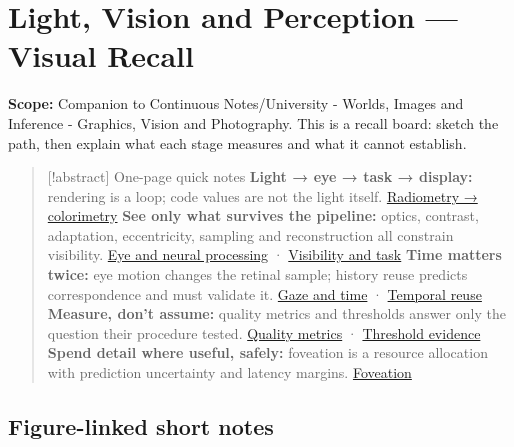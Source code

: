 \hypertarget{appendix-73c6b8ed5a87}{}\label{referencestart:appendix-73c6b8ed5a87}
\section{Light, Vision and Perception --- Visual Recall}\label{appendix-73c6b8ed5a87-light-vision-and-perception-visual-recall}

\textbf{Scope:} Companion to {Continuous Notes/University - Worlds, Images and Inference - Graphics, Vision and Photography}. This is a recall board: sketch the path, then explain what each stage measures and what it cannot establish.

\begin{quote}
{[}!abstract{]} One-page quick notes \textbf{Light → eye → task → display:} rendering is a loop; code values are not the light itself. \hyperref[04-visual-computing-ii-ch042-light-must-become-a-quantity-before-it-becomes-a-color]{Radiometry → colorimetry} \textbf{See only what survives the pipeline:} optics, contrast, adaptation, eccentricity, sampling and reconstruction all constrain visibility. \hyperref[04-visual-computing-ii-ch042-the-eye-is-an-optical-instrument-with-neural-processing-inside-it]{Eye and neural processing} · \hyperref[04-visual-computing-ii-ch042-visibility-is-about-contrast-conditions-and-tasks]{Visibility and task} \textbf{Time matters twice:} eye motion changes the retinal sample; history reuse predicts correspondence and must validate it. \hyperref[04-visual-computing-ii-ch042-a-gaze-sample-needs-a-time-as-well-as-a-direction]{Gaze and time} · \hyperref[04-visual-computing-ii-ch042-temporal-reconstruction-is-an-inference-about-correspondence]{Temporal reuse} \textbf{Measure, don't assume:} quality metrics and thresholds answer only the question their procedure tested. \hyperref[04-visual-computing-ii-ch042-quality-numbers-need-a-question-they-can-actually-answer]{Quality metrics} · \hyperref[04-visual-computing-ii-ch042-a-threshold-is-evidence-from-a-procedure-not-a-universal-border]{Threshold evidence} \textbf{Spend detail where useful, safely:} foveation is a resource allocation with prediction uncertainty and latency margins. \hyperref[04-visual-computing-ii-ch042-foveation-is-allocation-under-uncertain-perception-and-timing]{Foveation}
\end{quote}

\subsection{Figure-linked short notes}\label{appendix-73c6b8ed5a87-figure-linked-short-notes}

